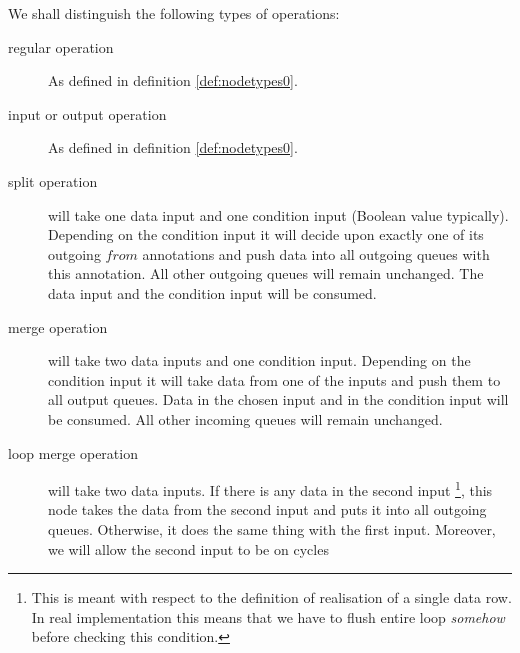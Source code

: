   We shall distinguish the following types of operations:
\begin{description}
\item [regular operation] As defined in definition \ref{def:nodetypes0}.
\item [input or output operation] As defined in definition \ref{def:nodetypes0}.
  \item [split operation] will take one data input and one condition input (Boolean value typically). Depending on the condition input it will decide upon exactly one of its outgoing $from$ annotations and push data into all outgoing queues with this annotation. All other outgoing queues will remain unchanged. The data input and the condition input will be consumed.
  \item [merge operation] will take two data inputs and one condition input. Depending on the condition input it will take data from one of the inputs and push them to all output queues. Data in the chosen input and in the condition input will be consumed. All other incoming queues will remain unchanged.

  \item [loop merge operation] will take two data inputs. If there is any data in the second input \footnote{This is meant with respect to the definition of realisation of a single data row. In real implementation this means that we have to flush entire loop \emph{somehow} before checking this condition.}, this node takes the data from the second input and puts it into all outgoing queues. Otherwise, it does the same thing with the first input. Moreover, we will allow the second input to be on cycles



\end{description}
